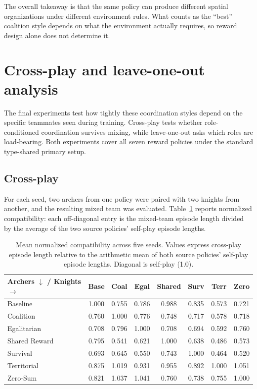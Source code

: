 The overall takeaway is that the same policy can produce different spatial organizations under different environment rules. What counts as the ``best'' coalition style depends on what the environment actually requires, so reward design alone does not determine it.



\section{Cross-play and leave-one-out analysis}
\label{sec:cross-play-loo}

The final experiments test how tightly these coordination styles depend on the specific teammates seen during training. Cross-play tests whether role-conditioned coordination survives mixing, while leave-one-out asks which roles are load-bearing. Both experiments cover all seven reward policies under the standard type-shared primary setup.

\subsection{Cross-play}
For each seed, two archers from one policy were paired with two knights from another, and the resulting mixed team was evaluated. Table~\ref{tab:cross-play-compat} reports normalized compatibility: each off-diagonal entry is the mixed-team episode length divided by the average of the two source policies' self-play episode lengths.
\begin{table}[H]
\centering
\small
\setlength{\tabcolsep}{4pt}
\begin{tabular}{lccccccc}
\toprule
\textbf{Archers $\downarrow$ / Knights $\rightarrow$} & Base & Coal & Egal & Shared & Surv & Terr & Zero \\
\midrule
Baseline & 1.000 & 0.755 & 0.786 & 0.988 & 0.835 & 0.573 & 0.721 \\
Coalition & 0.760 & 1.000 & 0.776 & 0.748 & 0.717 & 0.578 & 0.718 \\
Egalitarian & 0.708 & 0.796 & 1.000 & 0.708 & 0.694 & 0.592 & 0.760 \\
Shared Reward & 0.795 & 0.541 & 0.621 & 1.000 & 0.638 & 0.486 & 0.573 \\
Survival & 0.693 & 0.645 & 0.550 & 0.743 & 1.000 & 0.464 & 0.520 \\
Territorial & 0.875 & 1.019 & 0.931 & 0.955 & 0.892 & 1.000 & 1.051 \\
Zero-Sum & 0.821 & 1.037 & 1.041 & 0.760 & 0.738 & 0.755 & 1.000 \\
\bottomrule
\end{tabular}
\caption[Cross-play compatibility matrix]{Mean normalized compatibility across five seeds. Values express cross-play episode length relative to the arithmetic mean of both source policies' self-play episode lengths. Diagonal is self-play (1.0).}
\label{tab:cross-play-compat}
\end{table}

